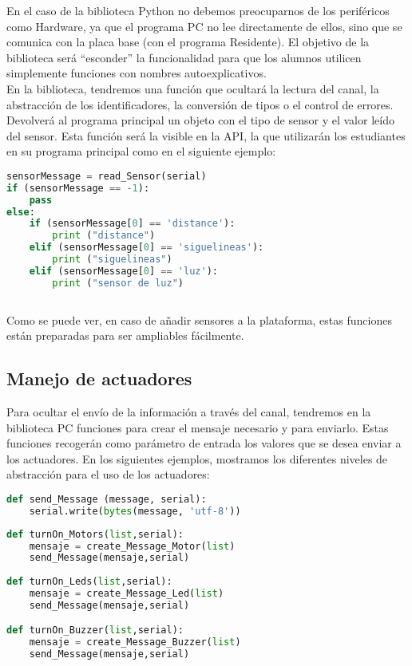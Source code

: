 En el caso de la biblioteca Python no debemos preocuparnos de los periféricos como Hardware, ya que el programa PC no lee directamente de ellos, sino que se comunica con la placa base (con el programa Residente). El objetivo de la biblioteca será ``esconder'' la funcionalidad para que los alumnos utilicen simplemente funciones con nombres autoexplicativos.\\
En la biblioteca, tendremos una función que ocultará la lectura del canal, la abstracción de los identificadores, la conversión de tipos o el control de errores. Devolverá al programa principal un objeto con el tipo de sensor y el valor leído del sensor. 
Esta función será la visible en la API, la que utilizarán los estudiantes en su programa principal como en el siguiente ejemplo:

\begin{lstlisting}[language=python,caption={Lectura de sensores en el Programa Principal}]
sensorMessage = read_Sensor(serial)
if (sensorMessage == -1):
	pass
else:
	if (sensorMessage[0] == 'distance'):
		print ("distance")
	elif (sensorMessage[0] == 'siguelineas'):
		print ("siguelineas")
	elif (sensorMessage[0] == 'luz'):
		print ("sensor de luz")
	
\end{lstlisting}

Como se puede ver, en caso de añadir sensores a la plataforma, estas funciones están preparadas para ser ampliables fácilmente.

\subsection{Manejo de actuadores}\label{subsec:actuadoresPython}
Para ocultar el envío de la información a través del canal, tendremos en la biblioteca PC funciones para crear el mensaje necesario y para enviarlo. Estas funciones recogerán como parámetro de entrada los valores que se desea enviar a los actuadores. En los siguientes ejemplos, mostramos los diferentes niveles de abstracción para el uso de los actuadores:\\

\begin{lstlisting}[language=python,caption={Función de la biblioteca PC para el envío de información a través del canal}]
def send_Message (message, serial):
	serial.write(bytes(message, 'utf-8'))		
\end{lstlisting}
\begin{lstlisting}[language=python,caption={Funciones de la biblioteca PC para el envío de mensajes a los actuadores}]
def turnOn_Motors(list,serial):
	mensaje = create_Message_Motor(list)
	send_Message(mensaje,serial)
		
def turnOn_Leds(list,serial):
	mensaje = create_Message_Led(list)
	send_Message(mensaje,serial)

def turnOn_Buzzer(list,serial):
	mensaje = create_Message_Buzzer(list)
	send_Message(mensaje,serial)
\end{lstlisting}


